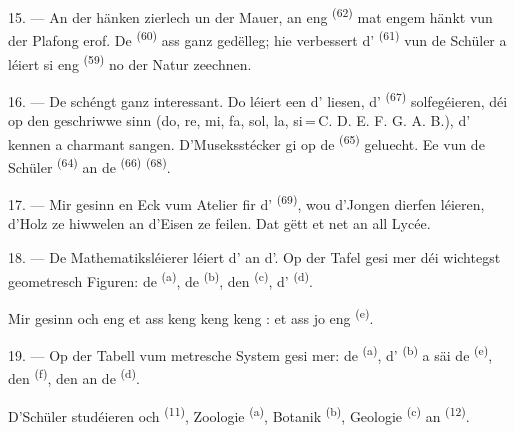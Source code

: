 15. --- An der  hänken zierlech  un der Mauer, an
eng  \textsuperscript{(62)} mat engem  hänkt vun der
Plafong erof. De  \textsuperscript{(60)} ass ganz gedëlleg; hie
verbessert d' \textsuperscript{(61)} vun de Schüler a léiert si
eng  \textsuperscript{(59)} no der Natur zeechnen.

16. --- De  schéngt ganz interessant. Do léiert een d'
liesen, d' \textsuperscript{(67)} solfegéieren, déi op den
 geschriwwe sinn (do, re, mi, fa, sol, la,
si\,=\,C. D. E. F. G. A. B.), d' kennen a charmant
 sangen. D'Museksstécker gi op de 
\textsuperscript{(65)} geluecht. Ee vun de Schüler 
\textsuperscript{(64)} an de  \textsuperscript{(66)}
 \textsuperscript{(68)}.

17. --- Mir gesinn en Eck vum Atelier fir d'
\textsuperscript{(69)}, wou d'Jongen dierfen léieren, d'Holz ze hiwwelen an d'Eisen ze
feilen. Dat gëtt et net an all Lycée.

\VUsaut{5.0mm}
\VUsaut{3.6mm}

18. --- De Mathematiksléierer léiert d'  an d'. Op der Tafel gesi mer déi wichtegst
geometresch Figuren: de  \textsuperscript{(a)}, de 
\textsuperscript{(b)}, den  \textsuperscript{(c)}, d'
\textsuperscript{(d)}.

Mir gesinn och eng  et ass keng  keng
 keng : et ass jo eng
 \textsuperscript{(e)}.

19. --- Op der Tabell vum metresche System gesi mer: de 
\textsuperscript{(a)}, d' \textsuperscript{(b)} a säi  de
 \textsuperscript{(e)}, den  \textsuperscript{(f)},
den  an de  \textsuperscript{(d)}.

D'Schüler studéieren och  \textsuperscript{(11)}, Zoologie
\textsuperscript{(a)}, Botanik \textsuperscript{(b)}, Geologie \textsuperscript{(c)}
an  \textsuperscript{(12)}.

